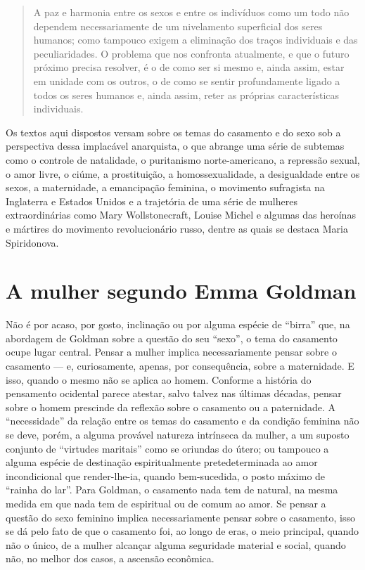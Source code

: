 \begin{quote}
A paz e harmonia entre os sexos e entre os indivíduos como um todo não
dependem necessariamente de um nivelamento superficial dos seres
humanos; como tampouco exigem a eliminação dos traços individuais e das
peculiaridades. O problema que nos confronta atualmente, e que o futuro
próximo precisa resolver, é o de como ser si mesmo e, ainda assim, estar
em unidade com os outros, o de como se sentir profundamente ligado a
todos os seres humanos e, ainda assim, reter as próprias características
individuais.
\end{quote}

Os textos aqui dispostos versam sobre os temas do casamento e do sexo
sob a perspectiva dessa implacável anarquista, o que abrange uma série
de subtemas como o controle de natalidade, o puritanismo
norte-americano, a repressão sexual, o amor livre, o ciúme, a
prostituição, a homossexualidade, a desigualdade entre os sexos, a
maternidade, a emancipação feminina, o movimento sufragista na
Inglaterra e Estados Unidos e a trajetória de uma série de mulheres
extraordinárias como Mary Wollstonecraft, Louise Michel e algumas das
heroínas e mártires do movimento revolucionário russo, dentre as quais
se destaca Maria Spiridonova.

\section{A mulher segundo Emma Goldman }

Não é por acaso, por gosto, inclinação ou por alguma espécie de
``birra'' que, na abordagem de Goldman sobre a questão do seu ``sexo'',
o tema do casamento ocupe lugar central. Pensar a mulher implica
necessariamente pensar sobre o casamento --- e, curiosamente, apenas, por
consequência, sobre a maternidade. E isso, quando o mesmo não se aplica
ao homem. Conforme a história do pensamento ocidental parece atestar,
salvo talvez nas últimas décadas, pensar sobre o homem prescinde da
reflexão sobre o casamento ou a paternidade. A ``necessidade'' da
relação entre os temas do casamento e da condição feminina não se deve,
porém, a alguma provável natureza intrínseca da mulher, a um suposto
conjunto de ``virtudes maritais'' como se oriundas do útero; ou tampouco
a alguma espécie de destinação espiritualmente pretedeterminada ao amor
incondicional que render-lhe-ia, quando bem-sucedida, o posto máximo de
``rainha do lar''. Para Goldman, o casamento nada tem de natural, na
mesma medida em que nada tem de espiritual ou de comum ao amor. Se
pensar a questão do sexo feminino implica necessariamente pensar sobre o
casamento, isso se dá pelo fato de que o casamento foi, ao longo de
eras, o meio principal, quando não o único, de a mulher alcançar alguma
seguridade material e social, quando não, no melhor dos casos, a
ascensão econômica.

